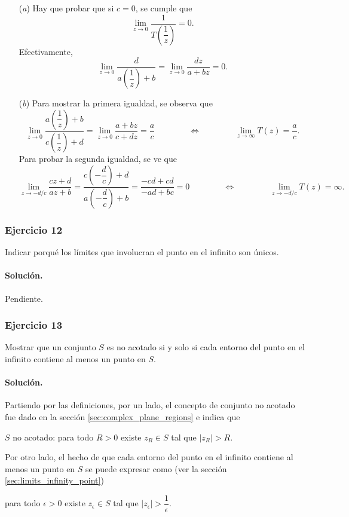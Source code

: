 \documentclass[a4paper]{report}
\begin{document}
\begin{enumerate}
 \item[(\textit{a})] Hay que probar que si \(c=0\), se cumple que
 \[
  \lim_{z\to0}\dfrac{1}{T\left(\dfrac{1}{z}\right)}=0.
 \]
 Efectivamente,
 \[
  \lim_{z\to0}\dfrac{d}{a\left(\dfrac{1}{z}\right)+b}=
  \lim_{z\to0}\dfrac{dz}{a+bz}=0.
 \]
 \item[(\textit{b})] Para mostrar la primera igualdad, se observa que 
 \[
  \lim_{z\to0}\dfrac{a\left(\dfrac{1}{z}\right)+b}{c\left(\dfrac{1}{z}\right)+d}=
  \lim_{z\to0}\dfrac{a+bz}{c+dz}=
  \frac{a}{c}
  \qquad\qquad\Leftrightarrow\qquad\qquad
  \lim_{z\to\infty}T(z)=\frac{a}{c}.
 \]
 Para probar la segunda igualdad, se ve que 
 \[
  \lim_{z\to-d/c}\frac{cz+d}{az+b}=
  \dfrac{c\left(-\dfrac{d}{c}\right)+d}{a\left(-\dfrac{d}{c}\right)+b}=
  \frac{-cd+cd}{-ad+bc}=0
  \qquad\qquad\Leftrightarrow\qquad\qquad
  \lim_{z\to-d/c}T(z)=\infty.
 \]
\end{enumerate}
 
\subsubsection{Ejercicio 12}

Indicar porqué los límites que involucran el punto en el infinito son únicos.

\paragraph{Solución.} Pendiente.

\subsubsection{Ejercicio 13}

Mostrar que un conjunto \(S\) es no acotado si y solo si cada entorno del punto en el infinito contiene al menos un punto en \(S\).

\paragraph{Solución.} Partiendo por las definiciones, por un lado, el concepto de conjunto no acotado fue dado en la sección \ref{sec:complex_plane_regions} e indica que
\begin{center}
 \(S\) no acotado: para todo \(R>0\) existe \(z_R\in S\) tal que \(|z_R|>R\).
\end{center}
Por otro lado, el hecho de que cada entorno del punto en el infinito contiene al menos un punto en \(S\) se puede expresar como (ver la sección \ref{sec:limits_infinity_point})
\begin{center}
 para todo \(\epsilon>0\) existe \(z_\epsilon\in S\) tal que \(|z_\epsilon|>\dfrac{1}{\epsilon}\).
\end{center}
\end{document}
